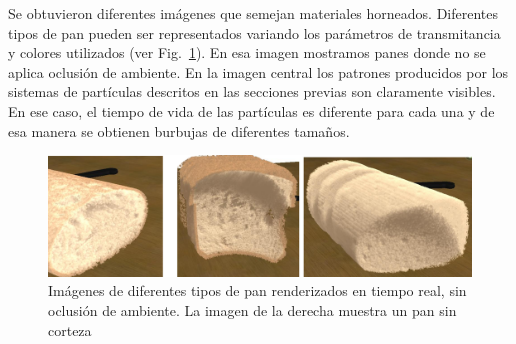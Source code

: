 Se obtuvieron diferentes imágenes que semejan materiales horneados.
Diferentes tipos de pan pueden ser representados variando los parámetros de transmitancia y colores utilizados (ver Fig.~\ref{fg:fig5}).
En esa imagen mostramos panes donde no se aplica oclusión de ambiente.
En la imagen central los patrones producidos por los sistemas de partículas descritos en las secciones previas son claramente visibles.
En ese caso, el tiempo de vida de las partículas es diferente para cada una y de esa manera se obtienen burbujas de diferentes tamaños.

\begin{figure}[htb!]
  \centerline{\includegraphics[width=13cm]{fig5}}
  \caption{Imágenes de diferentes tipos de pan renderizados en tiempo real, sin oclusión de ambiente. La imagen de la derecha muestra un pan sin corteza}
  \label{fg:fig5}
\end{figure}





